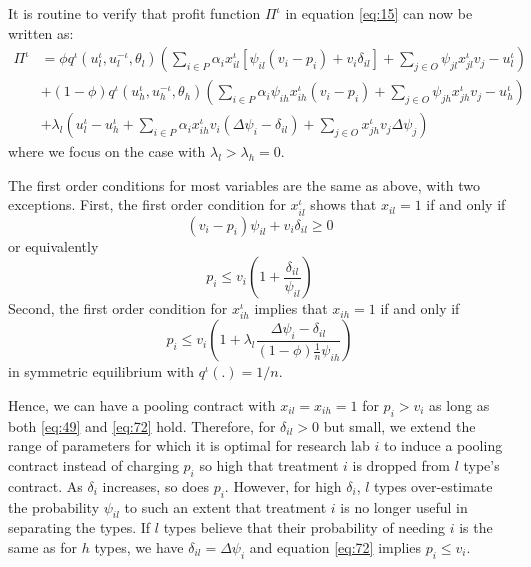 \documentclass[12pt,english,a4paper]{article}
\begin{document}
It is routine to verify that profit function \(\Pi^{\iota}\) in equation \eqref{eq:15} can now be written as:
\begin{equation}
\label{eq:15b}
\begin{split}
\Pi^{\iota} &= \phi q^{\iota}(u_l^{\iota},u_l^{-\iota},\theta_l) (\sum_{i \in P} \alpha_i x_{il}^{\iota}[\psi_{il}(v_i-p_i)+v_i \delta_{il}] + \sum_{j \in O} \psi_{jl} x_{jl}^{\iota} v_j - u_l^{\iota}) \\
    &+ (1-\phi) q^{\iota}(u_h^{\iota},u_h^{-\iota},\theta_h) (\sum_{i \in P} \alpha_i \psi_{ih} x_{ih}^{\iota} (v_i-p_i) + \sum_{j \in O} \psi_{jh} x_{jh}^{\iota} v_j - u_h^{\iota}) \\
    &+ \lambda_l (u_l^{\iota} - u_h^{\iota} + \sum_{i \in P} \alpha_i x_{ih}^{\iota} v_i (\Delta\psi_{i}-\delta_{il}) + \sum_{j \in O} x_{jh}^{\iota} v_j \Delta\psi_{j})
\end{split}
\end{equation}
where we focus on the case with \(\lambda_l>\lambda_h =0\).

The first order conditions for most variables are the same as above, with two exceptions. First, the first order condition for \(x_{il}^{\iota}\) shows that \(x_{il}=1\) if and only if
\begin{equation}
\label{eq:44}
(v_i-p_i)\psi_{il}+v_i \delta_{il} \geq 0
\end{equation}
or equivalently
\begin{equation}
\label{eq:49}
p_i \leq v_i \left(1+\frac{\delta_{il}}{\psi_{il}} \right)
\end{equation}
Second, the first order condition for \(x_{ih}^{\iota}\) implies that \(x_{ih}=1\) if and only if
\begin{equation}
\label{eq:72}
p_i \leq v_i \left(1+\lambda_l \frac{\Delta \psi_i -\delta_{il}}{(1-\phi)\frac{1}{n} \psi_{ih}} \right)
\end{equation}
in symmetric equilibrium with \(q^{\iota}(.)=1/n\).

Hence, we can have a pooling contract with \(x_{il}=x_{ih}=1\) for \(p_i>v_i\) as long as both \eqref{eq:49} and \eqref{eq:72} hold. Therefore, for \(\delta_{il} > 0\) but small, we extend the range of parameters for which it is optimal for research lab \(i\) to induce a pooling contract instead of charging \(p_i\) so high that treatment \(i\) is dropped from \(l\) type's contract. As \(\delta_i\) increases, so does \(p_i\). However, for high \(\delta_i\), \(l\) types over-estimate the probability \(\psi_{il}\) to such an extent that treatment \(i\) is no longer useful in separating the types. If \(l\) types believe that their probability of needing \(i\) is the same as for \(h\) types, we have \(\delta_{il} = \Delta \psi_i\) and equation \eqref{eq:72} implies \(p_i \leq v_i\).
\end{document}
